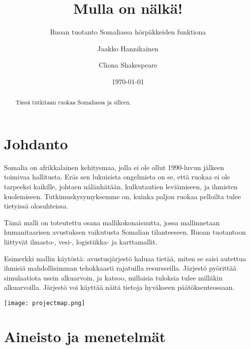 \documentclass[12pt]{scrreprt}
\title{Mulla on nälkä!}
\subtitle{Ruoan tuotanto Somaliassa hörpäkkeiden funktiona}
\author{Jaakko Hannikainen \and Cliona Shakespeare}
\date{\today}
\begin{document}
  \maketitle

  \begin{abstract}
    Tässä tutkitaan ruokaa Somaliassa ja silleen.
  \end{abstract}

  \tableofcontents

  \chapter{Johdanto}

  
  Somalia on afrikkalainen kehitysmaa, jolla ei ole ollut 1990-luvun jälkeen
  toimivaa hallitusta. Eräs sen lukuisista ongelmista on se, että ruokaa ei ole
  tarpeeksi kaikille, johtaen nälänhätään, kulkutautien leviämiseen, ja ihmisten
  kuolemiseen. Tutkimuskysymyksemme on, kuinka paljon ruokaa pelloilta tulee
  tietyissä olosuhteissa.
  
  Tämä malli on toteutettu osana mallikokonaisuutta, jossa mallinnetaan
  humanitaarisen avustuksen vaikutusta Somalian tilanteeseen. Ruoan tuotantoon
  liittyvät ilmasto-, vesi-, logistiikka- ja karttamallit.
  
  Esimerkki mallin käytöstä: avustusjärjestö haluaa tietää, miten se saisi
  autettua ihmisiä mahdollisimman tehokkaasti rajatuilla resursseilla. Järjestö
  pyörittää simulaatiota usein alkuarvoin, ja katsoo, millaisia tuloksia tulee
  milläkin alkuarvoilla. Järjestö voi käyttää näitä tietoja hyväkseen
  päätöksenteossaan.

  \texttt{[image: projectmap.png]}
  
  
  
  
  
  
  \chapter{Aineisto ja menetelmät}
\end{document}
